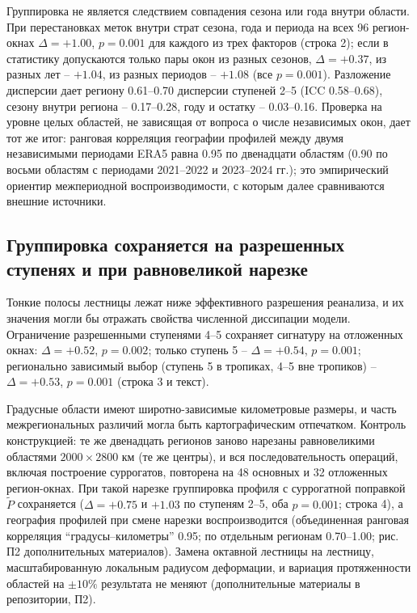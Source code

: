 \documentclass[12pt,a4paper]{article}
\begin{document}
Группировка не является следствием совпадения сезона или года внутри области. При перестановках меток внутри страт сезона, года и периода на всех 96 регион-окнах $\Delta = +1.00$, $p = 0.001$ для каждого из трех факторов (строка 2); если в статистику допускаются только пары окон из разных сезонов, $\Delta = +0.37$, из разных лет -- $+1.04$, из разных периодов -- $+1.08$ (все $p = 0.001$). Разложение дисперсии дает региону 0.61--0.70 дисперсии ступеней 2--5 (ICC 0.58--0.68), сезону внутри региона -- 0.17--0.28, году и остатку -- 0.03--0.16. Проверка на уровне целых областей, не зависящая от вопроса о числе независимых окон, дает тот же итог: ранговая корреляция географии профилей между двумя независимыми периодами ERA5 равна 0.95 по двенадцати областям (0.90 по восьми областям с периодами 2021--2022 и 2023--2024 гг.); это эмпирический ориентир межпериодной воспроизводимости, с которым далее сравниваются внешние источники.

\subsection{Группировка сохраняется на разрешенных ступенях и при равновеликой нарезке}

Тонкие полосы лестницы лежат ниже эффективного разрешения реанализа, и их значения могли бы отражать свойства численной диссипации модели. Ограничение разрешенными ступенями 4--5 сохраняет сигнатуру на отложенных окнах: $\Delta = +0.52$, $p = 0.002$; только ступень 5 -- $\Delta = +0.54$, $p = 0.001$; регионально зависимый выбор (ступень 5 в тропиках, 4--5 вне тропиков) -- $\Delta = +0.53$, $p = 0.001$ (строка 3 и текст).

Градусные области имеют широтно-зависимые километровые размеры, и часть межрегиональных различий могла быть картографическим отпечатком. Контроль конструкцией: те же двенадцать регионов заново нарезаны равновеликими областями $2000 \times 2800$ км (те же центры), и вся последовательность операций, включая построение суррогатов, повторена на 48 основных и 32 отложенных регион-окнах. При такой нарезке группировка профиля с суррогатной поправкой $\tilde P$ сохраняется ($\Delta = +0.75$ и $+1.03$ по ступеням 2--5, оба $p = 0.001$; строка 4), а география профилей при смене нарезки воспроизводится (объединенная ранговая корреляция “градусы--километры” 0.95; по отдельным регионам 0.70--1.00; рис. П2 дополнительных материалов). Замена октавной лестницы на лестницу, масштабированную локальным радиусом деформации, и вариация протяженности областей на $\pm10\%$ результата не меняют (дополнительные материалы в репозитории, П2).
\end{document}
